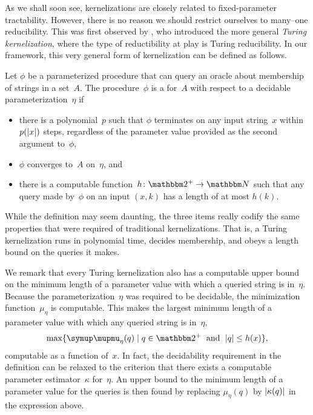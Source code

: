 As we shall soon see, kernelizations are closely related to fixed-parameter tractability.
However, there is no reason we should restrict ourselves to many--one reducibility.
This was first observed by \textcite{lokshtanov2009new}, who introduced the more general \emph{Turing kernelization}, where the type of reductibility at play is Turing reducibility.
In our framework, this very general form of kernelization can be defined as follows.
\begin{definition}
\label{def:turing_kernelization}%
  Let $\phi$ be a parameterized procedure that can query an oracle about membership of strings in a set~$A$.
  The procedure~$\phi$ is a  for~$A$ with respect to a decidable parameterization~$\eta$ if
  \begin{itemize}
  \item there is a polynomial~$p$ such that $\phi$ terminates on any input string~$x$ within $p({\lvert x\rvert})$ steps, regardless of the parameter value provided as the second argument to~$\phi$,
  \item $\phi$ converges to~$A$ on~$\eta$, and
  \item there is a computable function~$h\colon \binary^+ \to \bbN$ such that any query made by~$\phi$ on an input $(x, k)$ has a length of at most $h(k)$.
  \end{itemize}
\end{definition}
While the definition may seem daunting, the three items really codify the same properties that were required of traditional kernelizations.
That is, a Turing kernelization runs in polynomial time, decides membership, and obeys a length bound on the queries it makes.

We remark that every Turing kernelization also has a computable upper bound on the minimum length of a parameter value with which a queried string is in~$\eta$.
Because the parameterization~$\eta$ was required to be decidable, the minimization function~$\mu_\eta$ is computable.
This makes the largest minimum length of a parameter value with which any queried string is in~$\eta$,
\begin{equation*}
  \max \{\mu_\eta(q) \st q \in \binary^+ \reland \length{q} \le h(x)\},
\end{equation*}
computable as a function of~$x$.
In fact, the decidability requirement in the definition can be relaxed to the criterion that there exists a computable parameter estimator~$\kappa$ for~$\eta$.
An upper bound to the minimum length of a parameter value for the queries is then found by replacing $\mu_\eta(q)$ by ${\lvert\kappa(q)\rvert}$ in the expression above.

